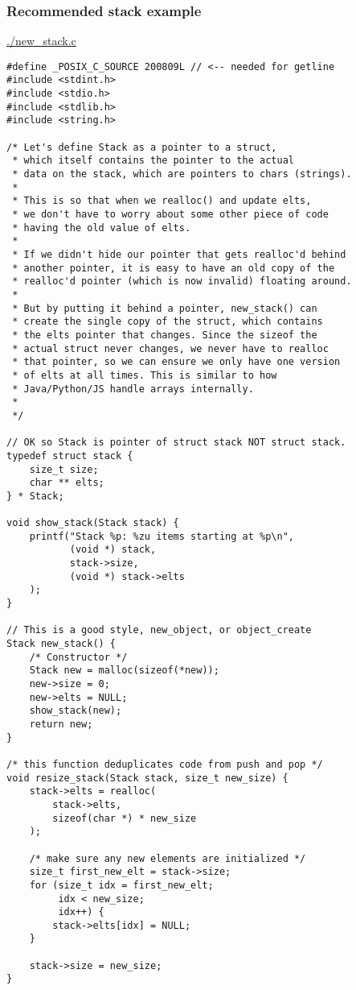 \documentclass[11pt]{article}
\begin{document}
\subsubsection{Recommended stack example}
\label{sec:org4a3cec6}
\url{./new\_stack.c}
\begin{verbatim}
#define _POSIX_C_SOURCE 200809L // <-- needed for getline
#include <stdint.h>
#include <stdio.h>
#include <stdlib.h>
#include <string.h>

/* Let's define Stack as a pointer to a struct,
 * which itself contains the pointer to the actual
 * data on the stack, which are pointers to chars (strings).
 * 
 * This is so that when we realloc() and update elts,
 * we don't have to worry about some other piece of code
 * having the old value of elts.
 * 
 * If we didn't hide our pointer that gets realloc'd behind
 * another pointer, it is easy to have an old copy of the
 * realloc'd pointer (which is now invalid) floating around.
 * 
 * But by putting it behind a pointer, new_stack() can
 * create the single copy of the struct, which contains
 * the elts pointer that changes. Since the sizeof the
 * actual struct never changes, we never have to realloc
 * that pointer, so we can ensure we only have one version
 * of elts at all times. This is similar to how
 * Java/Python/JS handle arrays internally.
 * 
 */

// OK so Stack is pointer of struct stack NOT struct stack.
typedef struct stack {
    size_t size;
    char ** elts;
} * Stack;

void show_stack(Stack stack) {
    printf("Stack %p: %zu items starting at %p\n",
           (void *) stack,
           stack->size,
           (void *) stack->elts
    );
}

// This is a good style, new_object, or object_create
Stack new_stack() {
    /* Constructor */
    Stack new = malloc(sizeof(*new));
    new->size = 0;
    new->elts = NULL;
    show_stack(new);
    return new;
}

/* this function deduplicates code from push and pop */
void resize_stack(Stack stack, size_t new_size) {
    stack->elts = realloc(
        stack->elts,
        sizeof(char *) * new_size
    );
    
    /* make sure any new elements are initialized */
    size_t first_new_elt = stack->size;
    for (size_t idx = first_new_elt;
         idx < new_size;
         idx++) {
        stack->elts[idx] = NULL;
    }
    
    stack->size = new_size;
}


\end{verbatim}
\end{document}
